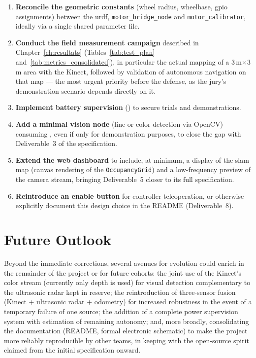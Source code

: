 \begin{enumerate}
	\item \textbf{Reconcile the geometric constants} (wheel radius, wheelbase,
	      \gls{gpio} assignments) between the \gls{urdf}, \texttt{motor\_bridge\_node}
	      and \texttt{motor\_calibrator}, ideally via a single shared parameter file.
	\item \textbf{Conduct the field measurement campaign} described in
	      Chapter~\ref{ch:resultats} (Tables~\ref{tab:test_plan}
	      and~\ref{tab:metrics_consolidated}), in particular the actual mapping of a
	      3\,m$\times$3\,m area with the Kinect, followed by validation of autonomous
	      navigation on that map --- the most urgent priority before the defense, as the
	      jury's demonstration scenario depends directly on it.
	\item \textbf{Implement battery supervision} () to secure
	      trials and demonstrations.
	\item \textbf{Add a minimal vision node} (line or color detection via OpenCV)
	      consuming , even if only for demonstration
	      purposes, to close the gap with Deliverable~3 of the specification.
	\item \textbf{Extend the web dashboard} to include, at minimum, a display of the
	      \gls{slam} map (canvas rendering of the \texttt{OccupancyGrid}) and a
	      low-frequency preview of the camera stream, bringing Deliverable~5 closer to
	      its full specification.
	\item \textbf{Reintroduce an enable button} for controller teleoperation, or
	      otherwise explicitly document this design choice in the README
	      (Deliverable~8).
\end{enumerate}

\section{Future Outlook}
\label{sec:bilan_perspectives}

Beyond the immediate corrections, several avenues for evolution could enrich \esibot{}
in the remainder of the project or for future cohorts: the joint use of the Kinect's
color stream (currently only depth is used) for visual detection complementary to the
ultrasonic radar kept in reserve; the reintroduction of three-sensor fusion (Kinect +
ultrasonic radar + odometry) for increased robustness in the event of a temporary
failure of one source; the addition of a complete power supervision system with
estimation of remaining autonomy; and, more broadly, consolidating the documentation
(README, formal electronic schematic) to make the project more reliably reproducible by
other teams, in keeping with the open-source spirit claimed from the initial
specification onward.

